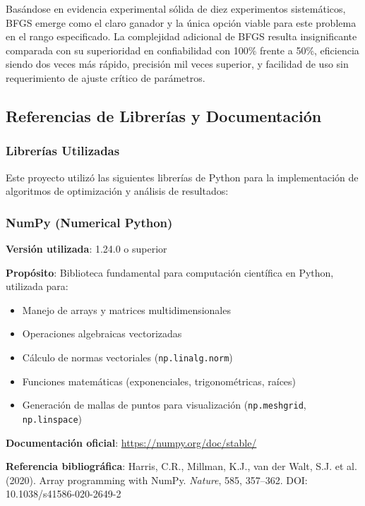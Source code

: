 \documentclass[12pt,a4paper]{article}
\begin{document}
Basándose en evidencia experimental sólida de diez experimentos sistemáticos, BFGS emerge como el claro ganador y la única opción viable para este problema en el rango especificado. La complejidad adicional de BFGS resulta insignificante comparada con su superioridad en confiabilidad con 100\% frente a 50\%, eficiencia siendo dos veces más rápido, precisión mil veces superior, y facilidad de uso sin requerimiento de ajuste crítico de parámetros.

\subsection*{Referencias de Librerías y Documentación}

\subsubsection*{Librerías Utilizadas}

Este proyecto utilizó las siguientes librerías de Python para la implementación de algoritmos de optimización y análisis de resultados:

\subsubsection*{NumPy (Numerical Python)}

\textbf{Versión utilizada}: 1.24.0 o superior

\textbf{Propósito}: Biblioteca fundamental para computación científica en Python, utilizada para:
\begin{itemize}
    \item Manejo de arrays y matrices multidimensionales
    \item Operaciones algebraicas vectorizadas
    \item Cálculo de normas vectoriales (\texttt{np.linalg.norm})
    \item Funciones matemáticas (exponenciales, trigonométricas, raíces)
    \item Generación de mallas de puntos para visualización (\texttt{np.meshgrid}, \texttt{np.linspace})
\end{itemize}

\textbf{Documentación oficial}: \url{https://numpy.org/doc/stable/}

\textbf{Referencia bibliográfica}:
Harris, C.R., Millman, K.J., van der Walt, S.J. et al. (2020). Array programming with NumPy. \textit{Nature}, 585, 357–362. DOI: 10.1038/s41586-020-2649-2
\end{document}
